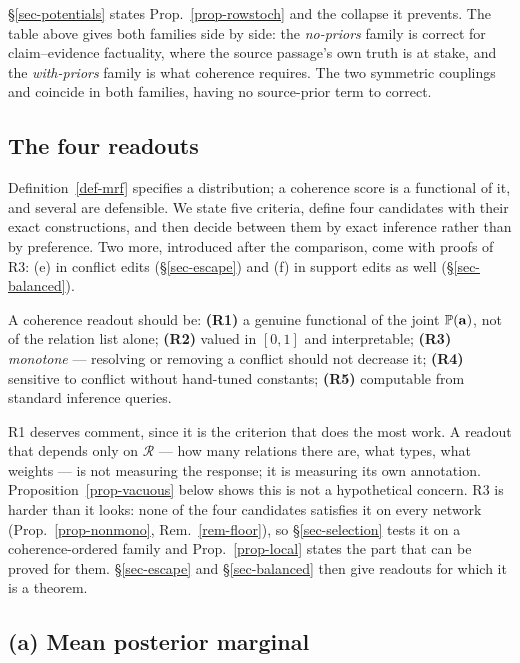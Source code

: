 \S\ref{sec-potentials} states Prop.~\ref{prop-rowstoch} and the collapse it prevents. The table
above gives both families side by side: the \emph{no-priors} family is correct for claim--evidence
factuality, where the source passage's own truth is at stake, and the \emph{with-priors} family is
what coherence requires. The two symmetric couplings \eqv{} and \exc{} coincide in both families,
having no source-prior term to correct.

\subsection{The four readouts}

Definition~\ref{def-mrf} specifies a distribution; a coherence score is a functional of it, and
several are defensible. We state five criteria, define four candidates with their exact
constructions, and then decide between them by exact inference rather than by preference. Two more,
introduced after the comparison, come with proofs of R3: (e) in conflict edits (\S\ref{sec-escape})
and (f) in support edits as well (\S\ref{sec-balanced}).

\begin{definition}[Criteria]
\label{def-criteria}
A coherence readout should be:
\textbf{(R1)} a genuine functional of the joint $\mathbb{P}\!\left( \mathbf{a} \right)$, not of the relation list alone;
\textbf{(R2)} valued in $[0,1]$ and interpretable;
\textbf{(R3)} \emph{monotone} --- resolving or removing a conflict should not decrease it;
\textbf{(R4)} sensitive to conflict without hand-tuned constants;
\textbf{(R5)} computable from standard inference queries.
\end{definition}

R1 deserves comment, since it is the criterion that does the most work. A readout that depends only
on $\mathcal{R}$ --- how many relations there are, what types, what weights --- is not measuring the
response; it is measuring its own annotation. Proposition~\ref{prop-vacuous} below shows this is not
a hypothetical concern. R3 is harder than it looks: none of the four candidates satisfies it on every network
(Prop.~\ref{prop-nonmono}, Rem.~\ref{rem-floor}), so \S\ref{sec-selection} tests it on a
coherence-ordered family and Prop.~\ref{prop-local} states the part that can be proved for them.
\S\ref{sec-escape} and \S\ref{sec-balanced} then give readouts for which it is a theorem.

\subsection{(a) Mean posterior marginal}

